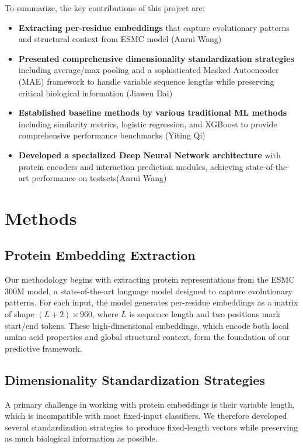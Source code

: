 \documentclass{article}
\begin{document}
To summarize, the key contributions of this project are:

\begin{itemize}
	\item \textbf{Extracting per-residue embeddings} that capture evolutionary patterns and structural context from ESMC model (Anrui Wang)
	
	\item \textbf{Presented comprehensive dimensionality standardization strategies} including average/max pooling and a sophisticated Masked Autoencoder (MAE) framework to handle variable sequence lengths while preserving critical biological information (Jiawen Dai)

	\item \textbf{Established baseline methods by various traditional ML methods} including similarity metrics, logistic regression, and XGBoost to provide comprehensive performance benchmarks (Yiting Qi)
	
	\item \textbf{Developed a specialized Deep Neural Network architecture} with protein encoders and interaction prediction modules, achieving state-of-the-art performance on testsets(Anrui Wang) 
\end{itemize}
	
	
	\section{Methods}

	\subsection{Protein Embedding Extraction}

	Our methodology begins with extracting protein representations from the ESMC 300M model, a state-of-the-art language model designed to capture evolutionary patterns. For each input, the model generates per-residue embeddings as a matrix of shape $(L+2) \times 960$, where $L$ is sequence length and two positions mark start/end tokens. These high-dimensional embeddings, which encode both local amino acid properties and global structural context, form the foundation of our predictive framework.
	
	\subsection{Dimensionality Standardization Strategies}

	A primary challenge in working with protein embeddings is their variable length, which is incompatible with most fixed-input classifiers. We therefore developed several standardization strategies to produce fixed-length vectors while preserving as much biological information as possible.
	
\end{document}
